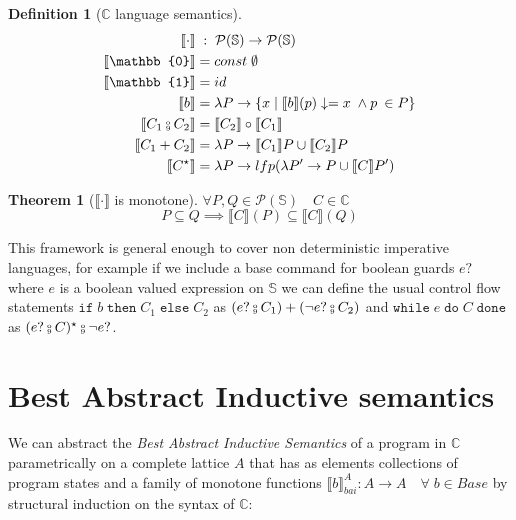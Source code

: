 \documentclass{article}
\newtheorem{definition}{Definition}
\newtheorem{theorem}{Theorem}
\def\rr{\rightarrow}
\newcommand*{\sem}[1]{
    \llbracket #1 \rrbracket
}
\newcommand{\bca}[2]{
    #2_{bai}^{#1}
}
\newcommand{\bsem}[2][A]{
    \bca{#1}{\sem{#2}}
}
\def\fcmp{\mathbin{\raise 0.6ex\hbox{\oalign{\hfil$\scriptscriptstyle      
    \mathrm{o}$\hfil\cr\hfil$\scriptscriptstyle\mathrm{9}$\hfil}}}}
\def\rr{\rightarrow}
\def\lang{\mathbb{C}}
\def\state{\mathbb{S}}
\def\pow{\mathcal{P}}
\begin{document}
    \begin{definition}[$\lang$ language semantics]
        \begin{align*}
            \sem{\cdot}         & \;:\; \pow(\state) \rr \pow(\state) \\
            \sem{\mathbb{0}}    &= const \; \emptyset \\
            \sem{\mathbb{1}}    &= id \\
            \sem{b}             &= \lambda P \rr \{ x 
                \mid \sem{b}(p)\downarrow = x \; \land p \: \in P \} \\
            \sem{C_1 \fcmp C_2} &= \sem{C_2} \circ \sem{C_1} \\
            \sem{C_1 + C_2}     &= \lambda P \rr \sem{C_1} P \cup \sem{C_2} P \\
            \sem{C^\star}       &= \lambda P \rr lfp(\lambda P' \rr
                P \cup \sem{C} P')
        \end{align*}
    \end{definition}

    \begin{theorem}[$\sem{\cdot}$ is monotone]
        $\forall P, Q \in \pow(\state) \quad C \in \lang$
        $$P \subseteq Q \implies \sem{C}(P) \subseteq \sem{C}(Q)$$
    \end{theorem}

    This framework is general enough to cover non deterministic imperative 
    languages, for example if we include a base command for boolean guards $e?$
    where $e$ is a boolean valued expression on $\state$ we can define the 
    usual control flow statements $\texttt{if} \; b \; \texttt{then} \; C_1 \; 
    \texttt{else} \; C_2$ as $(e ? \fcmp C_1) + (\neg e ? \fcmp C_2)$ and
    $\texttt{while} \; e \; \texttt{do} \; C \; \texttt{done}$ as $(e? \fcmp
    C)^\star \fcmp \neg e ?$.

\section{Best Abstract Inductive semantics}
    We can abstract the \textit{Best Abstract Inductive Semantics} of a program 
    in $\lang$ parametrically on a complete lattice $A$ that has as elements 
    collections of program states and a family of monotone functions 
    $\bsem{b} : A \rr A \quad \forall \; b \in Base$ by structural 
    induction on the syntax of $\lang$:
\end{document}
